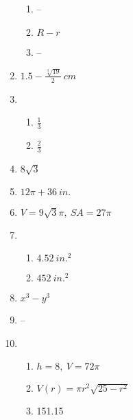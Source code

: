\documentclass{article}
\begin{document}
\begin{enumerate}
	\begin{enumerate}
	
	\item --
	
	\item $R - r$
	
	\item --
	
	\end{enumerate}
	
\item $1.5 - \frac{\sqrt[3]{19}}{2} \ cm$

\item 

	\begin{enumerate}
	
	\item $\frac{1}{3}$
	
	\item $\frac{2}{3}$
	
	\end{enumerate}
	
\item $8 \sqrt{3}$

\item $12 \pi + 36 \ in.$

\item $V = 9 \sqrt{3} \pi, \ SA = 27 \pi$

\item 

	\begin{enumerate}
	
	\item $4.52 \ in.^2$
	
	\item $452 \ in.^2$
	
	\end{enumerate}
	
\item $x^3 - y^3$

\item --
	
\item

	\begin{enumerate}
	
	\item $h = 8, \ V = 72 \pi$
	
	\item $V(r) = \pi r^2 \sqrt{25 - r^2}$
	
	\item 151.15
	

\end{enumerate}
\end{enumerate}
\end{document}
